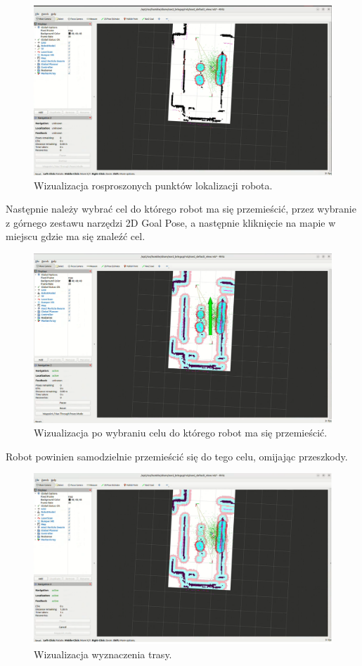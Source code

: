 \documentclass[a4paper,twoside,12pt]{book}
\begin{document}
\begin{figure}[!hb]
	\centering
	\includegraphics[width=1\textwidth]{images/launch-nav2.png}
	\caption{Wizualizacja rosproszonych punktów lokalizacji robota.}
	\label{fig:nav-map2}
\end{figure}
\newpage
Następnie należy wybrać cel do którego robot ma się przemieścić, przez wybranie z górnego zestawu narzędzi 2D Goal Pose, a następnie kliknięcie na mapie w miejscu gdzie ma się znaleźć cel.
\begin{figure}[!hb]
	\centering
	\includegraphics[width=1\textwidth]{images/launch-nav3.png}
	\caption{Wizualizacja po wybraniu celu do którego robot ma się przemieścić.}
	\label{fig:nav-map3}
\end{figure}
\newpage
Robot powinien samodzielnie przemieścić się do tego celu, omijając przeszkody.
\begin{figure}[!hb]
	\centering
	\includegraphics[width=1\textwidth]{images/launch-nav4.png}
	\caption{Wizualizacja wyznaczenia trasy.}
	\label{fig:nav-map4}
\end{figure}
\end{document}
